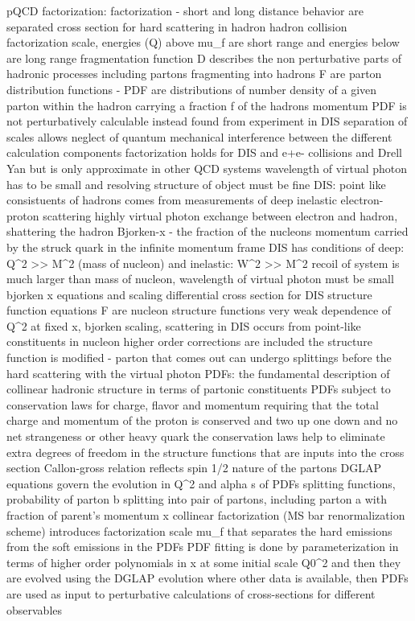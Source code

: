 pQCD
factorization:
factorization - short and long distance behavior are separated
cross section for hard scattering in hadron hadron collision 
factorization scale, energies (Q) above mu_f are short range and energies below are long range
fragmentation function D describes the non perturbative parts of hadronic processes including partons fragmenting into hadrons 
F are parton distribution functions - PDF are distributions of number density of a given parton within the hadron carrying a fraction f of the hadrons momentum 
PDF is not perturbatively calculable instead found from experiment in DIS 
separation of scales allows neglect of quantum mechanical interference between the different calculation components 
factorization holds for DIS and e+e- collisions and Drell Yan but is only approximate in other QCD systems 
wavelength of virtual photon has to be small and resolving structure of object must be fine
DIS:
point like consistuents of hadrons comes from measurements of deep inelastic electron-proton scattering
highly virtual photon exchange between electron and hadron, shattering the hadron
Bjorken-x - the fraction of the nucleons momentum carried by the struck quark in the infinite momentum frame
DIS has conditions of deep: Q^2 >> M^2 (mass of nucleon) and inelastic: W^2 >> M^2 recoil of system is much larger than mass of nucleon, wavelength of virtual photon must be small 
bjorken x equations and scaling 
differential cross section for DIS 
structure function equations 
F are nucleon structure functions 
very weak dependence of Q^2 at fixed x, bjorken scaling, scattering in DIS occurs from point-like constituents in nucleon
higher order corrections are included the structure function is modified - parton that comes out can undergo splittings before the hard scattering with the virtual photon
PDFs:
the fundamental description of collinear hadronic structure in terms of partonic constituents 
PDFs subject to conservation laws for charge, flavor and momentum requiring that the total charge and momentum of the proton is conserved and two up one down and no net strangeness or other heavy quark 
the conservation laws help to eliminate extra degrees of freedom in the structure functions that are inputs into the cross section 
Callon-gross relation reflects spin 1/2 nature of the partons 
DGLAP equations govern the evolution in Q^2 and alpha s of PDFs
splitting functions, probability of parton b splitting into pair of partons, including parton a with fraction of parent’s momentum x
collinear factorization (MS bar renormalization scheme) introduces factorization scale mu_f that separates the hard emissions from the soft emissions in the PDFs
PDF fitting is done by parameterization in terms of higher order polynomials in x at some initial scale Q0^2 and then they are evolved using the DGLAP evolution where other data is available, then PDFs are used as input to perturbative calculations of cross-sections for different observables 


